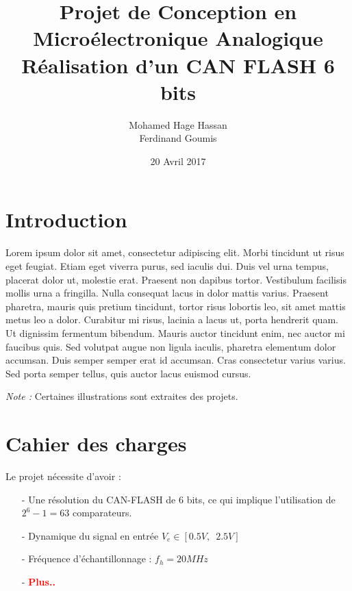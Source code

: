 \documentclass[11pt]{article}
\begin{document}
\title{\textbf{Projet de Conception en Micro\'electronique Analogique} \\ R\'ealisation d'un CAN FLASH 6 bits}
\author{Mohamed Hage Hassan \\ Ferdinand Goumis}
\date{20 Avril 2017}
\maketitle

\renewcommand{\abstractname}{Abstrait}

\begin{abstract}

\end{abstract}

\clearpage

\tableofcontents
\clearpage

\section{Introduction}

Lorem ipsum dolor sit amet, consectetur adipiscing elit. Morbi tincidunt ut risus eget feugiat.
Etiam eget viverra purus, sed iaculis dui. Duis vel urna tempus, placerat dolor ut, molestie erat.
Praesent non dapibus tortor. Vestibulum facilisis mollis urna a fringilla. Nulla consequat lacus in dolor mattis varius.
Praesent pharetra, mauris quis pretium tincidunt, tortor risus lobortis leo, sit amet mattis metus leo a dolor.
 Curabitur mi risus, lacinia a lacus ut, porta hendrerit quam. Ut dignissim fermentum bibendum.
 Mauris auctor tincidunt enim, nec auctor mi faucibus quis. Sed volutpat augue non ligula iaculis, pharetra elementum dolor accumsan.
 Duis semper semper erat id accumsan. Cras consectetur varius varius. Sed porta semper tellus, quis auctor lacus euismod cursus.

\textit{Note :} Certaines illustrations sont extraites des projets.

\section{Cahier des charges}
Le projet n\'ecessite d'avoir :
\begin{itemize}
\item[-] Une r\'esolution du CAN-FLASH de 6 bits, ce qui implique l'utilisation de $2^{6} -1 = 63 $ comparateurs.
\item[-] Dynamique du signal en entr\'ee $V_e \in [0.5 V,\phantom{2} 2.5V]$
\item[-] Fr\'equence d'\'echantillonnage : $f_h = 20 MHz $
\item[-] \textbf{\textcolor{red}{Plus..}}
\end{itemize}
\end{document}
